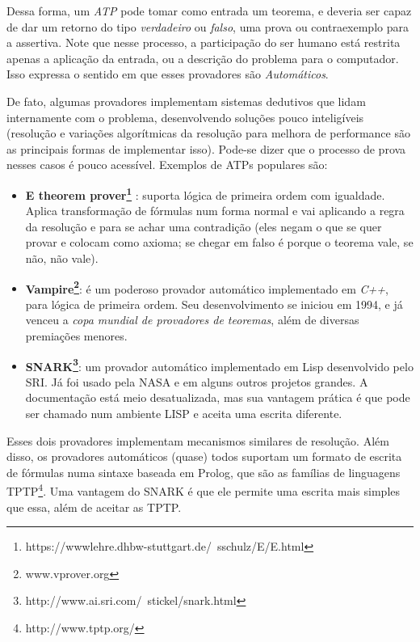 Dessa forma, um \textit{ATP} pode tomar como entrada um teorema, e deveria ser capaz de dar um retorno do tipo \textit{verdadeiro} ou \textit{falso}, uma prova ou contraexemplo para a assertiva.
Note que nesse processo, a participação do ser humano está restrita apenas a aplicação da entrada, ou a descrição do problema para o computador.
Isso expressa o sentido em que esses provadores são \textit{Automáticos}.

De fato, algumas provadores implementam sistemas dedutivos que lidam internamente com o problema, desenvolvendo soluções pouco inteligíveis (resolução e variações algorítmicas da resolução para melhora de performance são as principais formas de implementar isso).
Pode-se dizer que o processo de prova nesses casos é pouco acessível. Exemplos de ATPs populares são:

\begin{itemize}
    \item \textbf{E theorem prover\footnote{https://wwwlehre.dhbw-stuttgart.de/~sschulz/E/E.html}} : suporta lógica de primeira ordem com igualdade. Aplica transformação de fórmulas num forma normal e vai aplicando a regra da resolução e para se achar uma contradição (eles negam o que se quer provar e colocam como axioma; se chegar em falso é porque o teorema vale, se não, não vale).
    \pagebreak
    \item \textbf{Vampire\footnote{www.vprover.org}}: é um poderoso provador automático implementado em \textit{C++}, para lógica de primeira ordem. Seu desenvolvimento se iniciou em 1994, e já venceu a \textit{copa mundial de provadores de teoremas}, além de diversas premiações menores.
    \item \textbf{SNARK\footnote{http://www.ai.sri.com/~stickel/snark.html}}: um provador automático implementado em Lisp desenvolvido pelo SRI. Já foi usado pela NASA e em alguns outros projetos grandes. A documentação está meio desatualizada, mas sua vantagem prática é que pode ser chamado num ambiente LISP e aceita uma escrita diferente.
\end{itemize}

Esses dois provadores implementam mecanismos similares de resolução. Além disso, os provadores automáticos (quase) todos suportam um formato de escrita de fórmulas numa sintaxe baseada em Prolog, que são as famílias de linguagens TPTP\footnote{http://www.tptp.org/}. Uma vantagem do SNARK é que ele permite uma escrita mais simples que essa, além de aceitar as TPTP.

